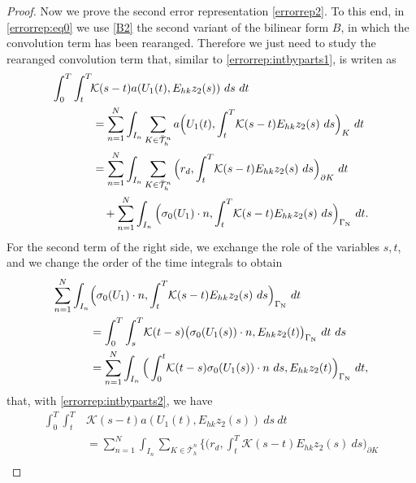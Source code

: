 \documentclass{amsart}
\numberwithin{equation}{section}
\theoremstyle{definition}
\begin{document}
\begin{proof}
Now we prove the second error representation \eqref{errorrep2}. 
To this end, in \eqref{errorrep:eq0} we use \eqref{B2} 
the second variant of the bilinear form $B$, in which the convolution 
term has been  rearanged. Therefore we just need to study the rearanged 
convolution term that, similar to \eqref{errorrep:intbyparts1}, is writen as  
\begin{equation}   \label{errorrep:intbyparts2}
  \begin{split}
    \int_0^T\int_t^T&\!{\mathcal K}(s-t)a(U_1(t),E_{hk}z_2(s))\ ds\ dt\\
    &=\sum_{n=1}^N\int_{I_n} \sum_{K\in\bar{\mathcal T}_h^n}
       a\Big(U_1(t),\int_t^T\! {\mathcal K}(s-t)E_{hk}z_2(s)\ ds\Big)_{K}\ dt\\
    &=\sum_{n=1}^N \int_{I_n}  \sum_{K\in \bar{\mathcal T}_h^n}
      \Big(r_d,\int_t^T\! {\mathcal K}(s-t)E_{hk}z_2(s)\ ds
      \Big)_{\partial K}\ dt\\
    &\quad +\sum_{n=1}^N\int_{I_n}
        \Big(\sigma_0(U_1)\cdot n,\int_t^T\! {\mathcal K}(s-t)E_{hk}z_2(s)\ ds
        \Big)_{\Gamma_{\text N}}\ dt.
  \end{split}
\end{equation}
For the second term of the right side, we exchange the role 
of the variables $s,t$, and we change the order of the time integrals to obtain 
\begin{equation}   \label{errorrep:intbyparts2_2}
  \begin{split}
    \sum_{n=1}^N\int_{I_n}
     &\Big(\sigma_0(U_1)\cdot n,\int_t^T\! {\mathcal K}(s-t)E_{hk}z_2(s)\ ds
        \Big)_{\Gamma_{\text N}}\ dt\\
     &=\int_0^T\int_s^T\! 
        {\mathcal K}(t-s) \big(\sigma_0(U_1(s))\cdot n,
          E_{hk}z_2(t)\big)_{\Gamma_{\text N}}\ dt\ ds\\
     &=\sum_{n=1}^N\int_{I_n}  
        \Big(\int_0^t\! {\mathcal K}(t-s) \sigma_0(U_1(s))\cdot n \ ds,E_{hk}z_2(t)
        \Big)_{\Gamma_{\text N}}\ dt,
  \end{split}
\end{equation}
that, with \eqref{errorrep:intbyparts2}, we have
\begin{equation*}  
  \begin{split}
    \int_0^T\int_t^T\! &{\mathcal K}(s-t)a(U_1(t),E_{hk}z_2(s))\ ds\ dt\\
    &=\sum_{n=1}^N \int_{I_n}\sum_{K\in \bar{\mathcal T}_h^n}
      \Big\{\Big(r_d,\int_t^T\! {\mathcal K}(s-t)E_{hk}z_2(s)\ ds
      \Big)_{\partial K}\\

\end{split}
\end{equation*}
\end{proof}
\end{document}
